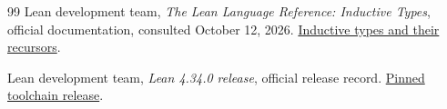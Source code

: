 \documentclass[11pt,letterpaper]{article}
\theoremstyle{definition}
\begin{document}
\begin{thebibliography}{99}
Lean development team, \emph{The Lean Language Reference: Inductive Types},
official documentation, consulted October 12, 2026.
\href{https://lean-lang.org/doc/reference/latest/The-Type-System/Inductive-Types/}{Inductive types and their recursors}.

Lean development team, \emph{Lean 4.34.0 release}, official release record.
\href{https://github.com/leanprover/lean4/releases/tag/v4.34.0}{Pinned toolchain release}.
\end{thebibliography}
\end{document}

